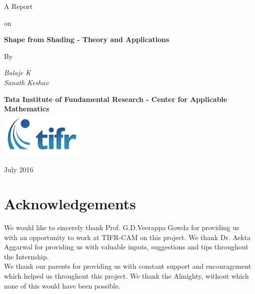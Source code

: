\documentclass{report}[14pt]
\begin{document}
	\begin{titlepage}
		\begin{center}
			\vspace*{1cm}
			\Large { A Report}

			\vspace{0.5cm}

			\Large{on}

			\vspace{0.5cm}
			\LARGE { \textbf{Shape from Shading - Theory and Applications} }

			\vspace{2cm}

			\Large{By}

			\vspace{1cm}

			\LARGE{\emph{Balaje K \\ Sanath Keshav}}

			\vspace{3cm}
			\LARGE{ \textbf{Tata Institute of Fundamental Research - Center for Applicable Mathematics}}\\

			\vspace{0.5cm}
			\includegraphics[scale = 1]{Images/TIFR_logo.png}

			\vspace{0.5cm}
			July 2016
		\end{center}
	\end{titlepage}

	\chapter*{Acknowledgements}
	We would like to sincerely thank Prof. G.D.Veerappa Gowda for providing us with an opportunity to work at TIFR-CAM on this project. We thank Dr. Aekta Aggarwal for providing us with valuable inputs, suggestions and tips throughout the Internship. \\
	
	\noindent
	We thank our parents for providing us with constant support and encouragement which helped us throughout this project. We thank the Almighty, without which none of this would have been possible.\\
	
\end{document}
